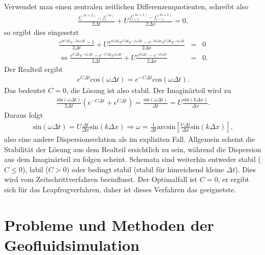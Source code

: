 \documentclass{book}
\renewcommand{\sin}{\text{sin}}
\renewcommand{\cos}{\text{cos}}
\renewcommand{\arcsin}{\text{arcsin}}
\begin{document}
Verwendet man einen zentralen zeitlichen Differenzenquotienten, schreibt also
%
\begin{eqnarray}
\frac{f_l^{(m + 2)} - f_l^{(m)}}{2\Delta t} + U\frac{f_{l + 1}^{(m + 1)} - f_{l - 1}^{(m + 1)}}{2\Delta x} = 0, 
\end{eqnarray}
%
so ergibt dies eingesetzt
%
\begin{eqnarray}
\frac{e^{2C\Delta t}e^{-2i\omega\Delta t} - 1}{2\Delta t} + U \frac{e^{ik\Delta x}e^{C\Delta t}e^{-i\omega\Delta t} - e^{-ik\Delta x}e^{C\Delta t}e^{-i\omega\Delta t}}{2\Delta x} & = & 0 \nonumber\\
\Leftrightarrow \frac{e^{C\Delta t}e^{-i\omega\Delta t} - e^{-C\Delta t}e^{i\omega\Delta t}}{2\Delta t} + U \frac{e^{ik\Delta x} - e^{-ik\Delta x}}{2\Delta x} & = & 0.
\end{eqnarray}
%
Der Realteil ergibt
%
\begin{eqnarray}
e^{C\Delta t}\cos\left(\omega\Delta t\right) = e^{-C\Delta t}\cos\left(\omega\Delta t\right).
\end{eqnarray}
%
Das bedeutet $C = 0$, die Lösung ist also stabil. Der Imaginärteil wird zu
%
\begin{eqnarray}
\frac{\sin\left(\omega\Delta t\right)}{2\Delta t}\left(e^{-C\Delta t} + e^{C\Delta t}\right) = \frac{\sin\left(\omega\Delta t\right)}{\Delta t} = U\frac{\sin\left(k\Delta x\right)}{\Delta x}.
\end{eqnarray}
%
Daraus folgt
%
\begin{eqnarray}
\sin\left(\omega\Delta t\right) = U\frac{\Delta t}{\Delta x}\sin\left(k\Delta x\right)\Rightarrow\omega = \frac{1}{\Delta t}\arcsin\left[\frac{U\Delta t}{\Delta x}\sin\left(k\Delta x\right)\right], 
\end{eqnarray}
%
also eine andere Dispersionsrelation als im expliziten Fall. Allgemein scheint die Stabilität der Lösung aus dem Realteil ersichtlich zu sein, während die Dispersion aus dem Imaginärteil zu folgen scheint. Schemata sind weiterhin entweder stabil ($C \leq 0$), labil ($C > 0$) oder bedingt stabil (stabil für hinreichend kleine $\Delta t$). Dies wird vom Zeitschrittverfahren beeinflusst. Der Optimalfall ist $C = 0$, er ergibt sich für das Leapfrogverfahren, daher ist dieses Verfahren das geeignetste.

\section{Probleme und Methoden der Geofluidsimulation}
\label{sec:probleme_und_methoden_der_geofluidsimulation}
\end{document}
